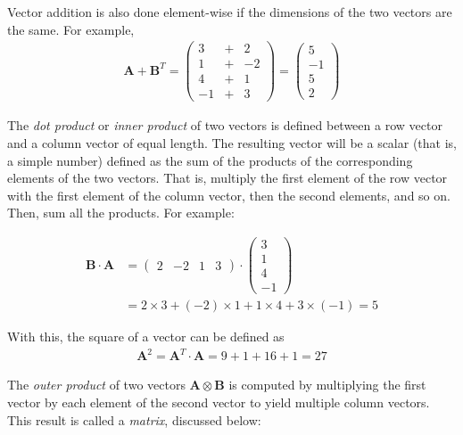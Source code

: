 Vector addition is also done element-wise if the dimensions of the two vectors are the same. For example,
\begin{align*}
\mathbf{A} + \mathbf{B}^T = \begin{pmatrix}3 &+& 2 \\
1 &+& -2 \\
4 &+& 1 \\
-1 &+& 3 \end{pmatrix} = \begin{pmatrix}5 \\ -1 \\ 5 \\ 2 \end{pmatrix}
\end{align*}

The \emph{dot product} or \emph{inner product} of two vectors is defined between a row vector and a column vector of equal length. The resulting vector will be a scalar (that is, a simple number) defined as the sum of the products of the corresponding elements of the two vectors. That is, multiply the first element of the row vector with the first element of the column vector, then the second elements, and so on. Then, sum all the products. For example:

\begin{align*}
\mathbf{B} \cdot \mathbf{A} &= \begin{pmatrix}2 & -2 & 1 & 3\end{pmatrix} \cdot \begin{pmatrix}3 \\ 1 \\ 4 \\ -1\end{pmatrix} \\
&= 2 \times 3 + (-2) \times 1 + 1 \times 4 + 3 \times (-1) = 5
\end{align*}

With this, the square of a vector can be defined as
\begin{align*}
\mathbf{A}^2 = \mathbf{A}^T \cdot \mathbf{A} = 9 + 1 + 16 + 1 = 27
\end{align*}

The \emph{outer product} of two vectors $\mathbf{A} \otimes \mathbf{B}$ is computed by multiplying the first vector by each element of the second vector to yield multiple column vectors. This result is called a \emph{matrix}, discussed below:

